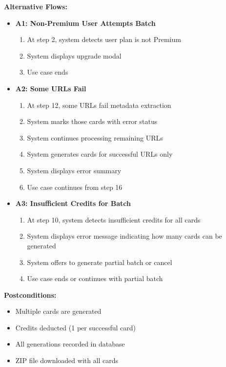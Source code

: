 \documentclass[12pt,a4paper]{article}
\begin{document}
\textbf{Alternative Flows:}
\begin{itemize}
    \item \textbf{A1: Non-Premium User Attempts Batch}
        \begin{enumerate}
            \item At step 2, system detects user plan is not Premium
            \item System displays upgrade modal
            \item Use case ends
        \end{enumerate}
    \item \textbf{A2: Some URLs Fail}
        \begin{enumerate}
            \item At step 12, some URLs fail metadata extraction
            \item System marks those cards with error status
            \item System continues processing remaining URLs
            \item System generates cards for successful URLs only
            \item System displays error summary
            \item Use case continues from step 16
        \end{enumerate}
    \item \textbf{A3: Insufficient Credits for Batch}
        \begin{enumerate}
            \item At step 10, system detects insufficient credits for all cards
            \item System displays error message indicating how many cards can be generated
            \item System offers to generate partial batch or cancel
            \item Use case ends or continues with partial batch
        \end{enumerate}
\end{itemize}

\textbf{Postconditions:}
\begin{itemize}
    \item Multiple cards are generated
    \item Credits deducted (1 per successful card)
    \item All generations recorded in database
    \item ZIP file downloaded with all cards
\end{itemize}
\end{document}
